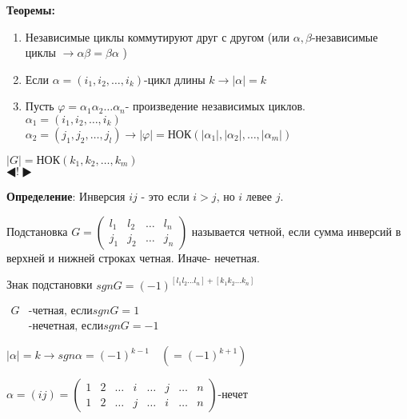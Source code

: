 \documentclass[12pt]{article}
\begin{document}
		\hypertarget{th:while}{\textbf{Теоремы:}}\begin{enumerate}
		
		
			\item Независимые циклы коммутируют друг с другом (или $\alpha ,\beta$-независимые циклы $\rightarrow \alpha\beta=\beta\alpha$ )
			
		
		
			\item Если $\alpha=(i_1,i_2, \dots ,i_k)$-цикл длины $k \rightarrow |\alpha|=k$
		
		
			\item Пусть $\varphi=\alpha_1\alpha_2\dots\alpha_n$- произведение независимых циклов.\\
			$\alpha_1=(i_1,i_2,\dots, i_k)$\\
			$\alpha_2=(j_1,j_2,\dots, j_l) \rightarrow |\varphi|=$НОК$(|\alpha_1|,|\alpha_2|,\dots,|\alpha_m|)$
		
		
		\end{enumerate}
		
			$|G|=\text{НОК}(k_1,k_2, \dots ,k_m)$\\
				$\LHD ! \RHD$
		
		\textbf{Определение}: Инверсия $ij$ - это если $i>j$, но $i$ левее $j$.
		
		Подстановка $G=\begin{pmatrix}
		l_1 & l_2 & \dots & l_n \\
		j_1 & j_2 & \dots & j_n
		\end{pmatrix}$ называется четной, если сумма инверсий в верхней и нижней строках четная. Иначе- нечетная.
		
		Знак подстановки $sgnG=(-1)^{[l_1l_2\dots l_n]+[k_1k_2\dots k_n]}$
		
		$\begin{aligned} 
		G  &\text{-четная, если}  sgnG=1\\
		&\text{-нечетная, если}  sgnG=-1
		\end{aligned}$
		
		$|\alpha|=k\rightarrow sgn\alpha=(-1)^{k-1} \quad (=(-1)^{k+1})$
		
		$\alpha=(ij)=\begin{pmatrix}
		1 & 2 & \dots & i & \dots & j & \dots & n \\
		1 & 2 & \dots & j & \dots & i & \dots & n 
		\end{pmatrix}$-нечет
		
\end{document}
